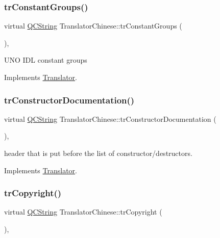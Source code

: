 \subsubsection{\texorpdfstring{trConstantGroups()}{trConstantGroups()}}
{\footnotesize\ttfamily virtual \mbox{\hyperlink{class_q_c_string}{Q\+C\+String}} Translator\+Chinese\+::tr\+Constant\+Groups (\begin{DoxyParamCaption}{ }\end{DoxyParamCaption})\hspace{0.3cm}{\ttfamily [inline]}, {\ttfamily [virtual]}}

U\+NO I\+DL constant groups 

Implements \mbox{\hyperlink{class_translator}{Translator}}.

\mbox{\label{class_translator_chinese_ab4a88be0f5d92125f8906711158646bb}} 
\subsubsection{\texorpdfstring{trConstructorDocumentation()}{trConstructorDocumentation()}}
{\footnotesize\ttfamily virtual \mbox{\hyperlink{class_q_c_string}{Q\+C\+String}} Translator\+Chinese\+::tr\+Constructor\+Documentation (\begin{DoxyParamCaption}{ }\end{DoxyParamCaption})\hspace{0.3cm}{\ttfamily [inline]}, {\ttfamily [virtual]}}

header that is put before the list of constructor/destructors. 

Implements \mbox{\hyperlink{class_translator}{Translator}}.

\mbox{\label{class_translator_chinese_a1623339d1e43357b1ba21f58a3382d43}} 
\subsubsection{\texorpdfstring{trCopyright()}{trCopyright()}}
{\footnotesize\ttfamily virtual \mbox{\hyperlink{class_q_c_string}{Q\+C\+String}} Translator\+Chinese\+::tr\+Copyright (\begin{DoxyParamCaption}{ }\end{DoxyParamCaption})\hspace{0.3cm}{\ttfamily [inline]}, {\ttfamily [virtual]}}

